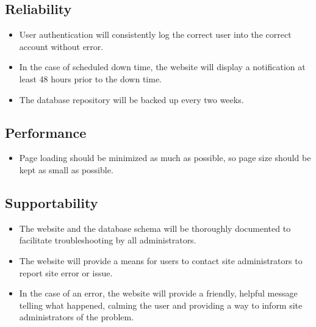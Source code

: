 	\subsection{Reliability}
	\begin{itemize}
		\item User authentication will consistently log the correct user into the correct account without error.
		\item In the case of scheduled down time, the website will display a notification at least 48 hours prior to the down time.
		\item The database repository will be backed up every two weeks.
	\end{itemize}
	
	\subsection{Performance}
	\begin{itemize}
		\item Page loading should be minimized as much as possible, so page size should be kept as small as possible. %
	\end{itemize}
	
	\subsection{Supportability}
	\begin{itemize}
		\item The website and the database schema will be thoroughly documented to facilitate troubleshooting by all administrators.
		\item The website will provide a means for users to contact site administrators to report site error or issue.
		\item In the case of an error, the website will provide a friendly, helpful message telling what happened, calming the user and providing a way to inform site administrators of the problem.
	\end{itemize}

\newpage
